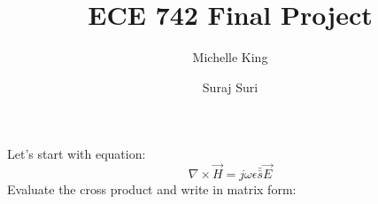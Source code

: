 \message{ !name(ECE742Project.tex)}\documentclass{article}
\title{ECE 742 Final Project}
\author{
  Michelle King
  \and
  Suraj Suri
  }
\begin{document}

Let's start with equation:
\[\nabla \times \vec{H} = j \omega \epsilon \bar{\bar{s}} \vec{E}\]
Evaluate the cross product and write in matrix form:

\end{document}
